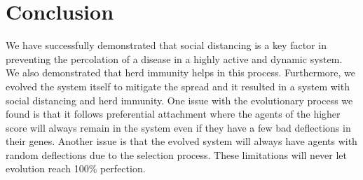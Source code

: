 \documentclass[a4paper,11pt]{article}
\begin{document}
    \section{Conclusion}\label{sec:conclusion}
    We have successfully demonstrated that social distancing is a key factor in preventing the percolation of a disease in a highly active and dynamic system.
    We also demonstrated that herd immunity helps in this process.
    Furthermore, we evolved the system itself to mitigate the spread and it resulted in a system with social distancing and herd immunity.
    One issue with the evolutionary process we found is that it follows preferential attachment\cite{barabasi} where the agents of the higher score will always remain in the system even if they have a few bad deflections in their genes.
    Another issue is that the evolved system will always have agents with random deflections due to the selection process.
    These limitations will never let evolution reach 100\% perfection.

    \printbibliography
\end{document}
